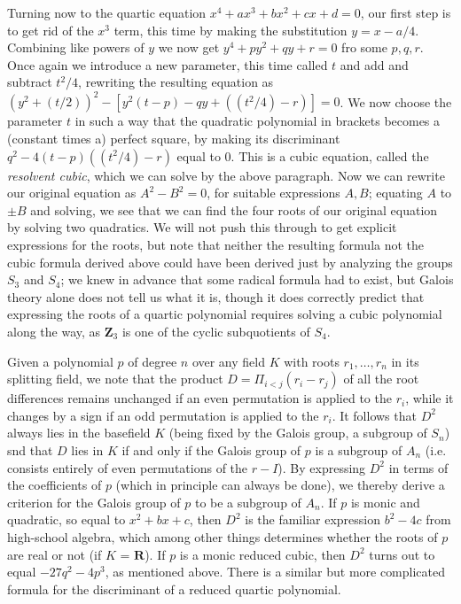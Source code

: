 \documentclass[10pt]{article}
\begin{document}
Turning now to the quartic equation $x^4 + ax^3 + bx^2 + cx + d = 0$,
our first step is to get rid of the $x^3$ term, this time by making the
substitution $y = x - a/4$. Combining like powers of $y$ we now get $y^4
+ py^2 + qy + r = 0$ fro some $p,q,r$. Once again we introduce a new
parameter, this time called $t$ and add and subtract $t^2/4$, rewriting
the resulting equation as $(y^2 + (t/2))^2 - [y^2(t-p) - qy + ((t^2/4) -
  r)] = 0$. We now choose the parameter $t$ in such a way that the
quadratic polynomial in brackets becomes a (constant times a) perfect
square, by making its discriminant $q^2 - 4(t-p)((t^2/4) - r)$ equal to
0. This is a cubic equation, called the {\sl resolvent cubic}, which we
can solve by the above paragraph. Now we can rewrite our original
equation as $A^2 - B^2 = 0$, for suitable expressions $A,B$; equating
$A$ to $\pm B$ and solving, we see that we can find the four roots of
our original equation by solving two quadratics. We will not push this
through to get explicit expressions for the roots, but note that neither
the resulting formula not the cubic formula derived above could have
been derived just by analyzing the groups $S_3$ and $S_4$; we knew in
advance that some radical formula had to exist, but Galois theory alone
does not tell us what it is, though it does correctly predict that
expressing the roots of a quartic polynomial requires solving a cubic
polynomial along the way, as $\mathbf Z_3$ is one of the cyclic
subquotients of $S_4$.

Given a polynomial $p$ of degree $n$ over any field $K$ with roots
$r_1,\ldots,r_n$ in its splitting field, we note that the product
$D=\Pi_{i<j} (r_i - r_j)$ of all the root differences remains unchanged
if an even permutation is applied to the $r_i$, while it changes by a
sign if an odd permutation is applied to the $r_i$. It follows that
$D^2$ always lies in the basefield $K$ (being fixed by the Galois group,
a subgroup of $S_n$) snd that $D$ lies in $K$ if and only if the Galois
group of $p$ is a subgroup of $A_n$ (i.e. consists entirely of even
permutations of the $r-I$). By expressing $D^2$ in terms of the
coefficients of $p$ (which in principle can always be done), we thereby
derive a criterion for the Galois group of $p$ to be a subgroup of
$A_n$. If $p$ is monic and quadratic, so equal to $x^2 + bx + c$, then
$D^2$ is the familiar expression $b^2 - 4c$ from high-school algebra,
which among other things determines whether the roots of $p$ are real or
not (if $K$ = $\mathbf R$). If $p$ is a monic reduced cubic, then $D^2$
turns out to equal $-27q^2 - 4p^3$, as mentioned above. There is a
similar but more complicated formula for the discriminant of a reduced
quartic polynomial.
\end{document}
